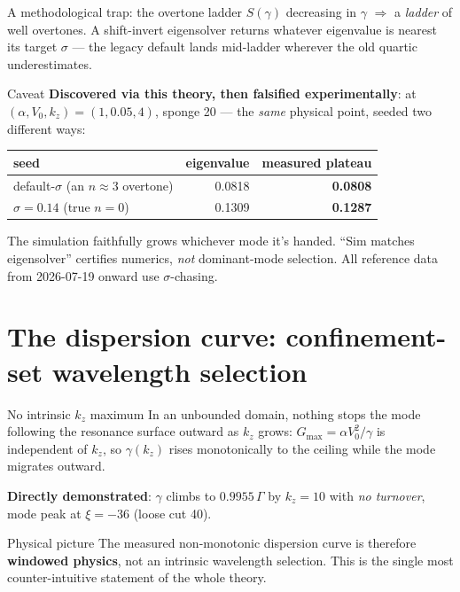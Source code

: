 \documentclass[aspectratio=169,11pt]{beamer}
\newenvironment{physpicture}{\begin{exampleblock}{Physical picture}}{\end{exampleblock}}
\newenvironment{caveat}{\begin{alertblock}{Caveat}}{\end{alertblock}}
\newcommand{\Vo}{V_0}
\newcommand{\kz}{k_z}
\newcommand{\Ceil}{\Gamma}
\begin{document}
\begin{frame}{A methodological trap: the overtone ladder}
\footnotesize
$S(\gamma)$ decreasing in $\gamma$ $\Rightarrow$ a \emph{ladder} of well overtones.
A shift-invert eigensolver returns whatever eigenvalue is nearest its target
$\sigma$ — the legacy default lands mid-ladder wherever the old quartic
underestimates.
\begin{caveat}
\textbf{Discovered via this theory, then falsified experimentally}: at
$(\alpha,\Vo,\kz)=(1,0.05,4)$, sponge 20 — the \emph{same} physical point, seeded
two different ways:
\begin{center}
\begin{tabular}{lrr}
seed & eigenvalue & measured plateau\\\midrule
default-$\sigma$ (an $n\approx3$ overtone) & 0.0818 & \textbf{0.0808}\\
$\sigma=0.14$ (true $n=0$) & 0.1309 & \textbf{0.1287}\\
\end{tabular}
\end{center}
The simulation faithfully grows whichever mode it's handed. ``Sim matches
eigensolver'' certifies numerics, \emph{not} dominant-mode selection. All
reference data from 2026-07-19 onward use $\sigma$-chasing.
\end{caveat}
\end{frame}

\section{The dispersion curve: confinement-set wavelength selection}

\begin{frame}{No intrinsic $\kz$ maximum}
In an unbounded domain, nothing stops the mode following the resonance surface
outward as $\kz$ grows: $G_{\max}=\alpha\Vo^2/\gamma$ is independent of $\kz$, so
$\gamma(\kz)$ rises monotonically to the ceiling while the mode migrates outward.
\begin{center}
\textbf{Directly demonstrated}: $\gamma$ climbs to $0.9955\,\Ceil$ by $\kz=10$
with \emph{no turnover}, mode peak at $\xi=-36$ (loose cut 40).
\end{center}
\begin{physpicture}
The measured non-monotonic dispersion curve is therefore \textbf{windowed
physics}, not an intrinsic wavelength selection. This is the single most
counter-intuitive statement of the whole theory.
\end{physpicture}
\end{frame}
\end{document}
